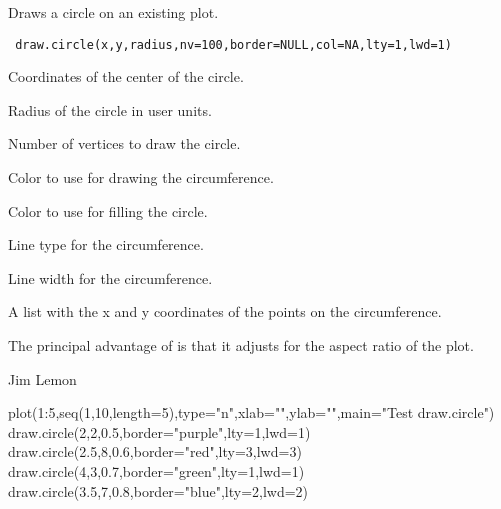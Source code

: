 \begin{Description}\relax
Draws a circle on an existing plot.
\end{Description}
\begin{Usage}
\begin{verbatim}
 draw.circle(x,y,radius,nv=100,border=NULL,col=NA,lty=1,lwd=1)
\end{verbatim}
\end{Usage}
\begin{Arguments}
\begin{ldescription}
\item[\code{x,y}] Coordinates of the center of the circle.
\item[\code{radius}] Radius of the circle in user units.
\item[\code{nv}] Number of vertices to draw the circle.
\item[\code{border}] Color to use for drawing the circumference.
\item[\code{col}] Color to use for filling the circle.
\item[\code{lty}] Line type for the circumference.
\item[\code{lwd}] Line width for the circumference.
\end{ldescription}
\end{Arguments}
\begin{Value}
A list with the x and y coordinates of the points on the circumference.
\end{Value}
\begin{Note}\relax
The principal advantage of  is that it adjusts for 
the aspect ratio of the plot.
\end{Note}
\begin{Author}\relax
Jim Lemon
\end{Author}
\begin{SeeAlso}\relax
{}
\end{SeeAlso}
\begin{Examples}
\begin{ExampleCode}
 plot(1:5,seq(1,10,length=5),type="n",xlab="",ylab="",main="Test draw.circle")
 draw.circle(2,2,0.5,border="purple",lty=1,lwd=1)
 draw.circle(2.5,8,0.6,border="red",lty=3,lwd=3)
 draw.circle(4,3,0.7,border="green",lty=1,lwd=1)
 draw.circle(3.5,7,0.8,border="blue",lty=2,lwd=2)
\end{ExampleCode}
\end{Examples}

